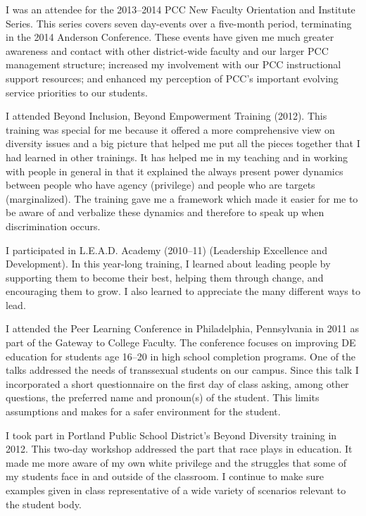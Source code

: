 \begin{description}[style=nextline]
	I was an attendee for the 2013--2014 PCC New Faculty Orientation and Institute
	Series.  This series covers seven day-events over a five-month period,
	terminating in the 2014 Anderson Conference.  These events have given me much
	greater awareness and contact with other district-wide faculty and our larger
	PCC management structure; increased my involvement with our PCC instructional
	support resources; and enhanced my perception of PCC's important evolving
	service priorities to our students.

	\item[Heiko Spoddeck (Full-time Instructor, Math Coordinator, Sylvania Campus)]
	I attended Beyond Inclusion, Beyond Empowerment Training (2012).  This training
	was special for me because it offered a more comprehensive view on diversity
	issues and a big picture that helped me put all the pieces together that I had
	learned in other trainings. It has helped me in my teaching and in working with
	people in general in that it explained the always present power dynamics
	between people who have agency (privilege) and people who are targets
	(marginalized). The training gave me a framework which made it easier for me to
	be aware of and verbalize these dynamics and therefore to speak up when
	discrimination occurs.

	I participated in L.E.A.D. Academy (2010--11) (Leadership Excellence and
	Development).  In this year-long training, I learned about leading people by
	supporting them to become their best, helping them through change, and
	encouraging them to grow. I also learned to appreciate the many different ways
	to lead.

	\item[Greta Swanson (Full-time Instructor, Sylvania Campus)]
	I attended the Peer Learning Conference in Philadelphia, Pennsylvania in 2011
	as part of the Gateway to College Faculty. The conference focuses on improving
	DE education for students age 16--20 in high school completion programs.
	One of the talks addressed the needs of transsexual students on our campus.
	Since this talk I incorporated a short questionnaire on the first day of class
	asking, among other questions, the preferred name and pronoun(s) of the
	student. This limits assumptions and makes for a safer environment for the
	student.

	I took part in Portland Public School District's Beyond Diversity training
	in 2012. This two-day workshop addressed the part that race plays in education.
	It made me more aware of my own white privilege and the struggles that some of
	my students face in and outside of the classroom. I continue to make sure
	examples given in class representative of a wide variety of scenarios relevant
	to the student body.


\end{description}
